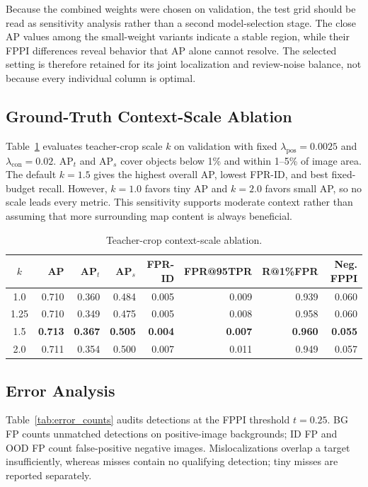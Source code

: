 \documentclass[conference,a4paper]{IEEEtran}
\begin{document}
Because the combined weights were chosen on validation, the test grid should be read as sensitivity analysis rather than a second model-selection stage. The close AP values among the small-weight variants indicate a stable region, while their FPPI differences reveal behavior that AP alone cannot resolve. The selected setting is therefore retained for its joint localization and review-noise balance, not because every individual column is optimal.

\subsection{Ground-Truth Context-Scale Ablation}
Table~\ref{tab:gt_scale_ablation} evaluates teacher-crop scale $k$ on validation with fixed $\lambda_{\mathrm{pos}}=0.0025$ and $\lambda_{\mathrm{con}}=0.02$. AP$_t$ and AP$_s$ cover objects below 1\% and within 1--5\% of image area. The default $k=1.5$ gives the highest overall AP, lowest FPR-ID, and best fixed-budget recall. However, $k=1.0$ favors tiny AP and $k=2.0$ favors small AP, so no scale leads every metric. This sensitivity supports moderate context rather than assuming that more surrounding map content is always beneficial.

\begin{table}[t]
\centering
\caption{Teacher-crop context-scale ablation.}
\label{tab:gt_scale_ablation}
\scriptsize
\setlength{\tabcolsep}{1.4pt}
\begin{tabular}{@{}crrrrrrr@{}}
\toprule
$k$ & AP & AP$_t$ & AP$_s$ & FPR-ID & FPR@95TPR & R@1\%FPR & Neg. FPPI \\
\midrule
1.0  & 0.710 & 0.360 & 0.484 & 0.005 & 0.009 & 0.939 & 0.060 \\
1.25 & 0.710 & 0.349 & 0.475 & 0.005 & 0.008 & 0.958 & 0.060 \\
1.5  & \textbf{0.713} & \textbf{0.367} & \textbf{0.505}
     & \textbf{0.004} & \textbf{0.007} & \textbf{0.960}
     & \textbf{0.055} \\
2.0  & 0.711 & 0.354 & 0.500 & 0.007 & 0.011 & 0.949 & 0.057 \\
\bottomrule
\end{tabular}
\end{table}

\subsection{Error Analysis}
Table~\ref{tab:error_counts} audits detections at the FPPI threshold $t=0.25$. BG FP counts unmatched detections on positive-image backgrounds; ID FP and OOD FP count false-positive negative images. Mislocalizations overlap a target insufficiently, whereas misses contain no qualifying detection; tiny misses are reported separately.
\end{document}
